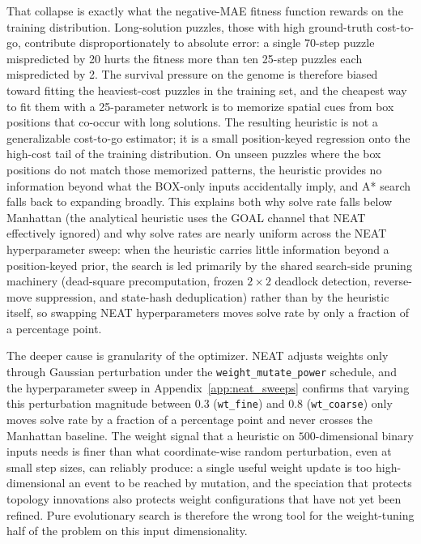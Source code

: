 That collapse is exactly what the negative-MAE fitness function rewards on the
training distribution. Long-solution puzzles, those with high ground-truth
cost-to-go, contribute disproportionately to absolute error: a single 70-step puzzle
mispredicted by 20 hurts the fitness more than ten 25-step puzzles each
mispredicted by 2. The survival pressure on the genome is therefore biased toward
fitting the heaviest-cost puzzles in the training set, and the cheapest way to
fit them with a 25-parameter network is to memorize spatial cues from box
positions that co-occur with long solutions. The resulting heuristic is not a
generalizable cost-to-go estimator; it is a small position-keyed regression onto
the high-cost tail of the training distribution. On unseen puzzles where the box
positions do not match those memorized patterns, the heuristic provides no
information beyond what the BOX-only inputs accidentally imply, and A* search
falls back to expanding broadly. This explains both why solve rate falls below
Manhattan (the analytical heuristic uses the GOAL channel that NEAT effectively
ignored) and why solve rates are nearly uniform across the NEAT hyperparameter
sweep: when the heuristic carries little information beyond a position-keyed
prior, the search is led primarily by the shared search-side pruning machinery
(dead-square precomputation, frozen $2\times2$ deadlock detection, reverse-move
suppression, and state-hash deduplication) rather than by the heuristic itself,
so swapping NEAT hyperparameters moves solve rate by only a fraction of a
percentage point.

The deeper cause is granularity of the optimizer. NEAT
adjusts weights only through Gaussian perturbation under the
\texttt{weight\_mutate\_power} schedule, and the hyperparameter sweep in
Appendix~\ref{app:neat_sweeps} confirms that varying this perturbation magnitude
between 0.3 (\texttt{wt\_fine}) and 0.8 (\texttt{wt\_coarse}) only moves solve rate
by a fraction of a percentage point and never crosses the Manhattan baseline. The
weight signal that a heuristic on $500$-dimensional binary inputs needs is finer
than what coordinate-wise random perturbation, even at small step sizes, can
reliably produce: a single useful weight update is too high-dimensional an event to
be reached by mutation, and the speciation that protects topology innovations also
protects weight configurations that have not yet been refined. Pure evolutionary
search is therefore the wrong tool for the weight-tuning half of the problem on
this input dimensionality.

